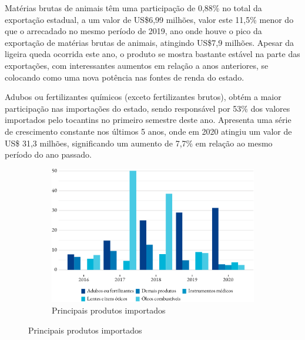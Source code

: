 \par Matérias brutas de animais têm uma participação de 0,88\% no total da exportação estadual, a um valor de US\$6,99 milhões, valor este 11,5\% menor do que o arrecadado no mesmo período de 2019, ano onde houve o pico da exportação de matérias brutas de animais, atingindo US\$7,9 milhões. Apesar da ligeira queda ocorrida este ano, o produto se mostra bastante estável na parte das exportações, com interessantes aumentos em relação a anos anteriores, se colocando como uma nova potência nas fontes de renda do estado.


\par Adubos ou fertilizantes químicos (exceto fertilizantes brutos), obtém a maior participação nas importações do estado, sendo responsável por 53\% dos valores importados pelo tocantins no primeiro semestre deste ano. Apresenta uma série de crescimento constante nos últimos 5 anos, onde em 2020 atingiu um valor de US\$ 31,3 milhões, significando um aumento de 7,7\% em relação ao mesmo período do ano passado.

\begin{figure}[!h]
	\begin{subfigure}{\linewidth}
		\caption{Principais produtos importados}
		\includegraphics{fig/produtos_import-1.pdf}
	\end{subfigure}
\end{figure}

